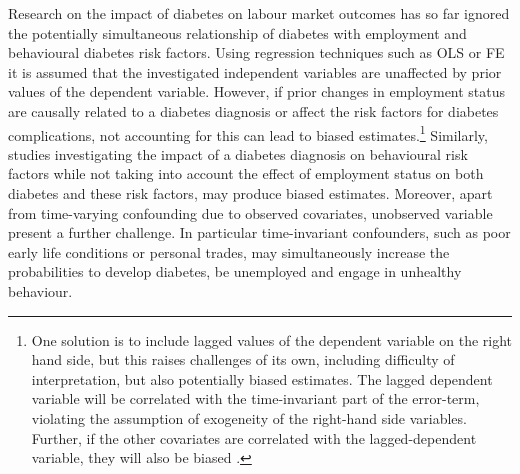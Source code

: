 Research on the impact of diabetes on labour market outcomes has so far ignored the potentially simultaneous relationship of diabetes with employment and behavioural diabetes risk factors. Using regression techniques such as \ac{OLS} or \ac{FE} it is assumed that the investigated independent variables are unaffected by prior values of the dependent variable. However, if prior changes in employment status are causally related to a diabetes diagnosis or affect the risk factors for diabetes complications, not accounting for this can lead to biased estimates.\footnote{One solution is to include lagged values of the dependent variable on the right hand side, but this raises challenges of its own, including difficulty of interpretation, but also potentially biased estimates. The lagged dependent variable will be correlated with the time-invariant part of the error-term, violating the assumption of exogeneity of the right-hand side variables. Further, if the other covariates are correlated with the lagged-dependent variable, they will also be biased \parencite{Anderson1982,Nickell1981}.} Similarly, studies investigating the impact of a diabetes diagnosis on behavioural risk factors while not taking into account the effect of employment status on both diabetes and these risk factors, may produce biased estimates. Moreover, apart from time-varying confounding due to observed covariates, unobserved variable present a further challenge. In particular time-invariant confounders, such as poor early life conditions or personal trades, may simultaneously increase the probabilities to develop diabetes, be unemployed and engage in unhealthy behaviour. 

